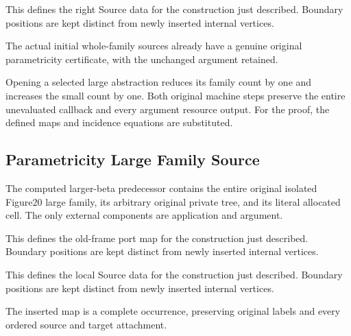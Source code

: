 This defines the right Source data for the construction just described. Boundary positions are kept distinct from newly inserted internal vertices.
\par{}

The actual initial whole-family sources already have a genuine original parametricity certificate, with the unchanged argument retained.
\par{}

Opening a selected large abstraction reduces its family count by one and increases the small count by one. Both original machine steps preserve the entire unevaluated callback and every argument resource output.
For the proof, the defined maps and incidence equations are substituted.
\par{}

\subsection{Parametricity Large Family Source}
The computed larger-beta predecessor contains the entire original isolated Figure20 large family, its arbitrary original private tree, and its literal allocated cell. The only external components are application and argument.

This defines the old-frame port map for the construction just described. Boundary positions are kept distinct from newly inserted internal vertices.
\par{}

This defines the local Source data for the construction just described. Boundary positions are kept distinct from newly inserted internal vertices.
\par{}

The inserted map is a complete occurrence, preserving original labels and every ordered source and target attachment.
\par{}

